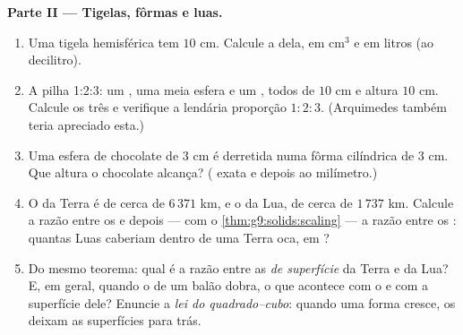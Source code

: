 \begin{problem}
\medskip
\noindent\textbf{Parte II --- Tigelas, fôrmas e luas.}
\begin{enumerate}[resume]
  \item Uma tigela hemisférica tem  $10$ cm. Calcule a 
        dela, em cm$^3$ e em litros (ao decilitro).
  \item A pilha 1:2:3: um , uma meia esfera e um , todos de
         $10$ cm e altura $10$ cm. Calcule os três  e
        verifique a lendária proporção $1 : 2 : 3$. (Arquimedes também
        teria apreciado esta.)
  \item Uma esfera de chocolate de  $3$ cm é derretida numa fôrma
        cilíndrica de  $3$ cm. Que altura o chocolate alcança?
        ( exata e depois ao milímetro.)
  \item O  da Terra é de cerca de $6\,371$ km, e o da Lua, de cerca
        de $1\,737$ km. Calcule a razão entre os  e depois --- com
        o \cref{thm:g9:solids:scaling} --- a razão entre os :
        quantas Luas caberiam dentro de uma Terra oca, em ?
  \item Do mesmo teorema: qual é a razão entre as \emph{ de
        superfície} da Terra e da Lua? E, em geral, quando o  de um
        balão dobra, o que acontece com o  e com a superfície
        dele? Enuncie a \emph{lei do quadrado--cubo}: quando uma forma
        cresce, os  deixam as superfícies para trás.
\end{enumerate}


\end{problem}
